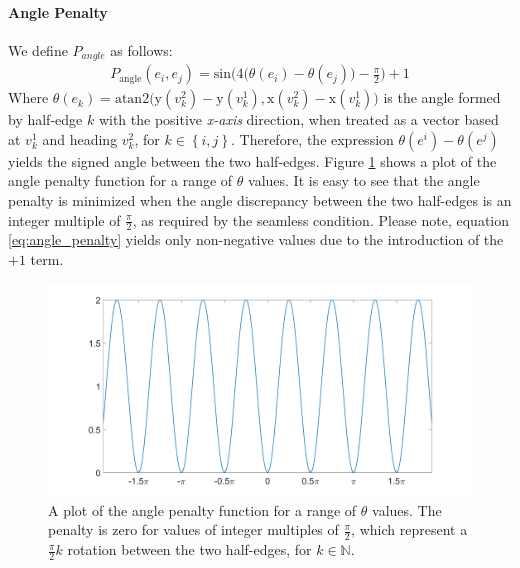 \paragraph{Angle Penalty}
We define $P_{angle}$ as follows:
\begin{equation}\label{eq:angle_penalty}
\begin{split}
P_{\mathrm{angle}}\left(e_i,e_j\right) = \mathrm{sin} \bigg( 4\Big(\theta\left(e_i\right) - \theta\left(e_j\right)\Big) - \frac{\pi}{2}\bigg) + 1
\end{split}
\end{equation}
Where $\theta\left(e_k\right) = \mathrm{atan2}\Big(\mathrm{y}\left(v_k^2\right) - \mathrm{y}\left(v_k^1\right), \mathrm{x}\left(v_k^2\right) - \mathrm{x}\left(v_k^1\right)\Big)$ is the angle formed by half-edge $k$ with the positive \emph{x-axis} direction, when treated as a vector based at $v_k^1$ and heading $v_k^2$, for $k \in \left\{i,j\right\}$. Therefore, the expression $\theta\left(e^i\right) - \theta\left(e^j\right)$ yields the signed angle between the two half-edges. Figure \ref{fig:angle_penalty} shows a plot of the angle penalty function for a range of $\theta$ values. It is easy to see that the angle penalty is minimized when the angle discrepancy between the two half-edges is an integer multiple of $\frac{\pi}{2}$, as required by the seamless condition. Please note, equation \ref{eq:angle_penalty} yields only non-negative values due to the introduction of the $+1$ term.
\begin{figure}[ht]
\centering
\includegraphics[width=12cm]{figures/seamless/angle_penalty_function.png}
\caption[The Angle Penalty Function]{A plot of the angle penalty function for a range of $\theta$ values. The penalty is zero for values of integer multiples of $\frac{\pi}{2}$, which represent a $\frac{\pi}{2}k$ rotation between the two half-edges, for $k \in \mathbb{N}$.}
\label{fig:angle_penalty}
\end{figure}

